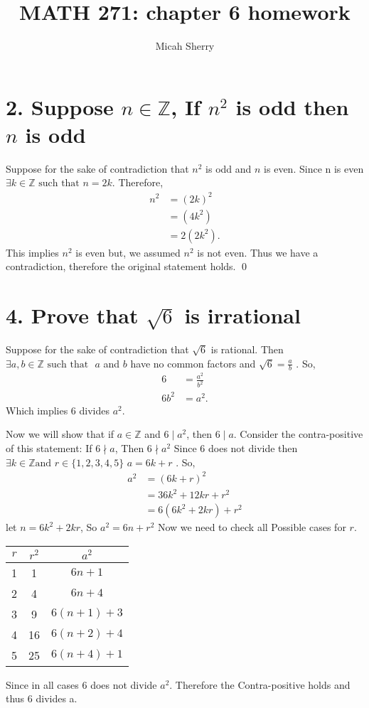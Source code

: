 \documentclass{article}
\title{MATH 271: chapter 6 homework}
\author{Micah Sherry}
\newcommand{\ints}{\mathbb{Z}}
\newcommand{\st}{\text{ such that }}
\begin{document}
	\maketitle
	
	\section*{2. Suppose $n \in \ints$, If $n^2$ is odd then $n$ is odd} 
	
	Suppose for the sake of contradiction that $n^2$ is odd and $n$ is even.
	Since n is even $\exists k \in \ints \st n=2k$.
	Therefore,
	\begin{align*}
		n^2 &= (2k)^2\\
		&= (4k^2)\\
		&= 2(2k^2).
	\end{align*}
	This implies $n^2$ is even but, we assumed $n^2$ is not even.
	Thus we have a contradiction, therefore the original statement holds. \qed
	
	\section*{4. Prove that $\sqrt{6}$ is irrational}
	
	Suppose for the sake of contradiction that $\sqrt{6}$ is rational. 
	Then $\exists a,b \in \ints \st $ $a$ and $b$ have no common factors and $\sqrt{6}= \frac{a}{b}$ .
	So, 
	\begin{align*}
		6    &= \frac{a^2}{b^2}\\
		6b^2 &= a^2. 
	\end{align*}
	Which implies 6 divides $a^2$.
	
	
	Now we will show that if $a \in \ints$ and $6 \mid a^2$, then $6 \mid a$.
	Consider the contra-positive of this statement: If $6 \nmid a$, Then $6 \nmid a^2$
	Since 6 does not divide then $ \exists k \in \ints \text{and } r \in \{1,2,3,4,5\} $ \st $ a= 6k+r$ .
	So,
	\begin{align*}
		a^2 &= (6k+r)^2\\
		&=36k^2+ 12kr + r^2\\
		&= 6(6k^2 + 2kr) + r^2
	\end{align*}
	let $n = 6k^2 + 2kr$, So $a^2 = 6n + r^2$ 
	Now we need to check all Possible cases for $r$.
	
	\begin{table}[h]
		\centering
		\begin{tabular}{|c|c|c|}
			\hline
			$r$ & $r^2$ & $a^2$\\
			\hline
			1 & 1   & $6n+1$\\
			2 & 4   & $6n+4$\\
			3 & 9   & $6(n+1)+3$\\
			4 & 16  & $6(n+2)+4$\\
			5 & 25  & $6(n+4)+1$\\					
			\hline
		\end{tabular}
		\label{tab: cases for r}
	\end{table}
	Since in all cases 6 does not divide $a^2$. Therefore the Contra-positive holds and thus 6 divides a.
	
\end{document}
